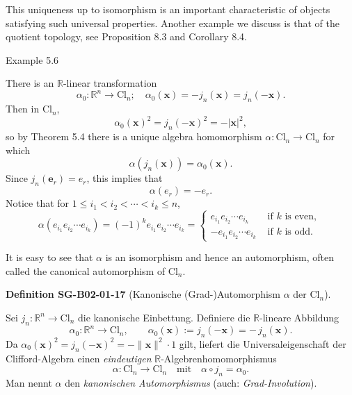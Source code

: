 \documentclass[10pt, letterpaper]{article}
\newcommand{\R}{\mathbb{R}}
\newcommand{\Cl}{\mathrm{Cl}}
\newcommand{\CustomHeading}[3]{%
  \par\medskip\noindent%
  \textbf{#1 #2} \textnormal{(#3)}.\enskip%
}
\newenvironment{DEF}[2]{\begin{unitbox}\CustomHeading{Definition}{#1}{#2}}{\end{unitbox}}
\begin{document}
This uniqueness up to isomorphism is an important characteristic of objects satisfying such universal properties. Another example we discuss is that of the quotient topology, see Proposition 8.3 and Corollary 8.4.



Example 5.6


There is an $\mathbb{R}$-linear transformation
$$
\alpha_{0}: \mathbb{R}^{n} \longrightarrow \mathrm{Cl}_{n} ; \quad \alpha_{0}(\mathbf{x})=-j_{n}(\mathbf{x})=j_{n}(-\mathbf{x}) .
$$
Then in $\mathrm{Cl}_{n}$,
$$
\alpha_{0}(\mathbf{x})^{2}=j_{n}(-\mathbf{x})^{2}=-|\mathbf{x}|^{2},
$$
so by Theorem 5.4 there is a unique algebra homomorphism $\alpha: \mathrm{Cl}_{n} \longrightarrow \mathrm{Cl}_{n}$ for which
$$
\alpha\left(j_{n}(\mathbf{x})\right)=\alpha_{0}(\mathbf{x}) .
$$
Since $j_{n}\left(\mathbf{e}_{r}\right)=e_{r}$, this implies that
$$
\alpha\left(e_{r}\right)=-e_{r} .
$$
Notice that for $1 \leqslant i_{1}<i_{2}<\cdots<i_{k} \leqslant n$,
$$
\alpha\left(e_{i_{1}} e_{i_{2}} \cdots e_{i_{k}}\right)=(-1)^{k} e_{i_{1}} e_{i_{2}} \cdots e_{i_{k}}=\left\{\begin{aligned}
e_{i_{1}} e_{i_{2}} \cdots e_{i_{k}} & \text { if } k \text { is even, } \\
-e_{i_{1}} e_{i_{2}} \cdots e_{i_{k}} & \text { if } k \text { is odd. }
\end{aligned}\right.
$$

It is easy to see that $\alpha$ is an isomorphism and hence an automorphism, often called the canonical automorphism of $\mathrm{Cl}_{n}$.




\begin{DEF}{SG-B02-01-17}{Kanonische (Grad-)Automorphism \(\alpha\) der \(\Cl_n\)}
Sei \(j_n:\R^n\to\Cl_n\) die kanonische Einbettung. Definiere die
\(\R\)-lineare Abbildung
\[
\alpha_0:\R^n\longrightarrow \Cl_n,\qquad \alpha_0(\mathbf x):=j_n(-\mathbf x)=-\,j_n(\mathbf x).
\]
Da \(\alpha_0(\mathbf x)^2=j_n(-\mathbf x)^2=-\lVert\mathbf x\rVert^2\cdot 1\) gilt, liefert die
Universal­eigenschaft der Clifford-Algebra einen \emph{eindeutigen}
\(\R\)-Algebrenhomomorphismus
\[
\alpha:\Cl_n\longrightarrow \Cl_n\quad\text{mit}\quad \alpha\circ j_n=\alpha_0.
\]
Man nennt \(\alpha\) den \emph{kanonischen Automorphismus} (auch: \emph{Grad-Involution}).
\end{DEF}
\end{document}
